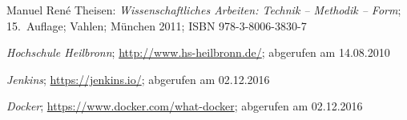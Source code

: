 \documentclass[12pt,toc=bib,toc=listof]{scrreprt}
\begin{document}

\appendix
\begin{thebibliography}{99}
\raggedright
 Manuel René Theisen:
 \emph{Wissenschaftliches Arbeiten: Technik -- Methodik -- Form};
 15.~Auflage; Vahlen; München 2011;
 ISBN 978-3-8006-3830-7

 \emph{Hochschule Heilbronn};
 \url{http://www.hs-heilbronn.de/};
 abgerufen am 14.08.2010
 
 \emph{Jenkins};
 \url{https://jenkins.io/};
 abgerufen am 02.12.2016
 
 \emph{Docker};
 \url{https://www.docker.com/what-docker};
 abgerufen am 02.12.2016

 
 
 
 
 
 
\end{thebibliography}
\end{document}
